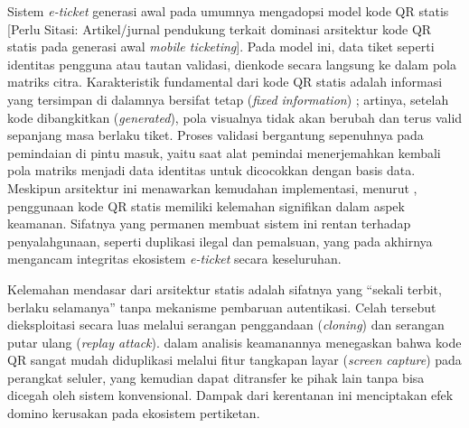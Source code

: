 Sistem \textit{e-ticket} generasi awal pada umumnya mengadopsi model kode QR statis [Perlu Sitasi: Artikel/jurnal pendukung terkait dominasi arsitektur kode QR statis pada generasi awal \textit{mobile ticketing}]. Pada model ini, data tiket seperti identitas pengguna atau tautan validasi, dienkode secara langsung ke dalam pola matriks citra. Karakteristik fundamental dari kode QR statis adalah informasi yang tersimpan di dalamnya bersifat tetap (\textit{fixed information}) \cite{yanuarafi2023perbandingan}; artinya, setelah kode dibangkitkan (\textit{generated}), pola visualnya tidak akan berubah dan terus valid sepanjang masa berlaku tiket. Proses validasi bergantung sepenuhnya pada pemindaian di pintu masuk, yaitu saat alat pemindai menerjemahkan kembali pola matriks menjadi data identitas untuk dicocokkan dengan basis data. Meskipun arsitektur ini menawarkan kemudahan implementasi, menurut \textcite{yanuarafi2023perbandingan}, penggunaan kode QR statis memiliki kelemahan signifikan dalam aspek keamanan. Sifatnya yang permanen membuat sistem ini rentan terhadap penyalahgunaan, seperti duplikasi ilegal dan pemalsuan, yang pada akhirnya mengancam integritas ekosistem \textit{e-ticket} secara keseluruhan.

Kelemahan mendasar dari arsitektur statis adalah sifatnya yang ``sekali terbit, berlaku selamanya'' tanpa mekanisme pembaruan autentikasi. Celah tersebut dieksploitasi secara luas melalui serangan penggandaan (\textit{cloning}) dan serangan putar ulang (\textit{replay attack}). \textcite{sung2015security} dalam analisis keamanannya menegaskan bahwa kode QR sangat mudah diduplikasi melalui fitur tangkapan layar (\textit{screen capture}) pada perangkat seluler, yang kemudian dapat ditransfer ke pihak lain tanpa bisa dicegah oleh sistem konvensional. Dampak dari kerentanan ini menciptakan efek domino kerusakan pada ekosistem pertiketan. 

